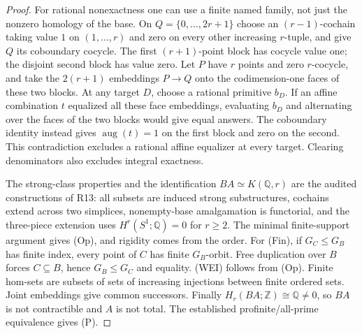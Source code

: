 \begin{proof}
For rational nonexactness one can use a finite named family, not just
the nonzero homology of the base. On $Q=\{0,\ldots,2r+1\}$ choose an
$(r-1)$-cochain taking value $1$ on $(1,\ldots,r)$ and zero on every
other increasing $r$-tuple, and give $Q$ its coboundary cocycle.
The first $(r+1)$-point block has cocycle value one; the disjoint
second block has value zero. Let $P$ have $r$ points and zero
$r$-cocycle, and take the $2(r+1)$ embeddings $P\to Q$ onto the
codimension-one faces of these two blocks. At any target $D$, choose
a rational primitive $b_D$. If an affine combination $t$ equalized
all these face embeddings, evaluating $b_D$ and alternating over
the faces of the two blocks would give equal answers. The coboundary
identity instead gives $\operatorname{aug}(t)=1$ on the first block
and zero on the second. This contradiction excludes a rational
affine equalizer at every target. Clearing denominators also excludes
integral exactness.

The strong-class properties and the identification
$BA\simeq K(\mathbb Q,r)$ are the audited constructions of R13:
all subsets are induced strong substructures, cochains extend across
two simplices, nonempty-base amalgamation is functorial, and the
three-piece extension uses $H^r(S^1;\mathbb Q)=0$ for $r\geq2$.
The minimal finite-support argument gives (Op), and rigidity comes
from the order. For (Fin), if $G_C\leq G_B$ has finite index, every
point of $C$ has finite $G_B$-orbit. Free duplication over $B$ forces
$C\subseteq B$, hence $G_B\leq G_C$ and equality. (WEI) follows
from (Op). Finite hom-sets are subsets of sets of increasing
injections between finite ordered sets. Joint embeddings give
common successors. Finally $H_r(BA;\mathbb Z)\cong\mathbb Q\ne0$,
so $BA$ is not contractible and $A$ is not total. The established
profinite/all-prime equivalence gives (P).
\end{proof}

